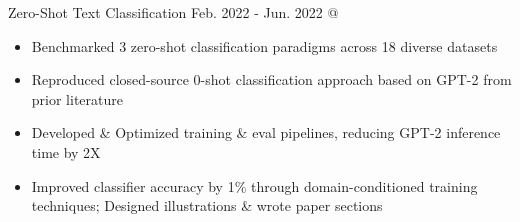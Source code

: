 \cveventSameLine{}
    {Zero-Shot Text Classification}
    {Feb. 2022 - Jun. 2022}{ @ }
\begin{itemize}

    \item Benchmarked 3 zero-shot classification paradigms across 18 diverse datasets

    \item Reproduced closed-source 0-shot classification approach based on GPT-2 from prior literature

    \item Developed \& Optimized training \& eval pipelines, reducing GPT-2 inference time by 2X

    \item Improved classifier accuracy by 1\% through domain-conditioned training techniques; Designed illustrations \& wrote paper sections
\end{itemize}
\dividerSmall


